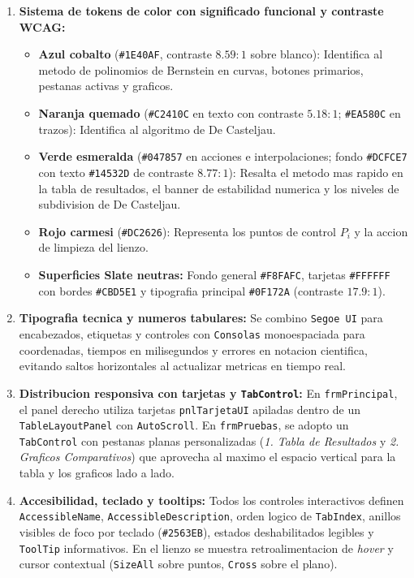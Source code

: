 \begin{enumerate}
    \item \textbf{Sistema de tokens de color con significado funcional y contraste WCAG:}
    \begin{itemize}
        \item \textbf{Azul cobalto} (\texttt{\#1E40AF}, contraste $8.59:1$ sobre blanco): Identifica al metodo de polinomios de Bernstein en curvas, botones primarios, pestanas activas y graficos.
        \item \textbf{Naranja quemado} (\texttt{\#C2410C} en texto con contraste $5.18:1$; \texttt{\#EA580C} en trazos): Identifica al algoritmo de De Casteljau.
        \item \textbf{Verde esmeralda} (\texttt{\#047857} en acciones e interpolaciones; fondo \texttt{\#DCFCE7} con texto \texttt{\#14532D} de contraste $8.77:1$): Resalta el metodo mas rapido en la tabla de resultados, el banner de estabilidad numerica y los niveles de subdivision de De Casteljau.
        \item \textbf{Rojo carmesi} (\texttt{\#DC2626}): Representa los puntos de control $P_i$ y la accion de limpieza del lienzo.
        \item \textbf{Superficies Slate neutras:} Fondo general \texttt{\#F8FAFC}, tarjetas \texttt{\#FFFFFF} con bordes \texttt{\#CBD5E1} y tipografia principal \texttt{\#0F172A} (contraste $17.9:1$).
    \end{itemize}

    \item \textbf{Tipografia tecnica y numeros tabulares:} Se combino \texttt{Segoe UI} para encabezados, etiquetas y controles con \texttt{Consolas} monoespaciada para coordenadas, tiempos en milisegundos y errores en notacion cientifica, evitando saltos horizontales al actualizar metricas en tiempo real.

    \item \textbf{Distribucion responsiva con tarjetas y \texttt{TabControl}:} En \texttt{frmPrincipal}, el panel derecho utiliza tarjetas \texttt{pnlTarjetaUI} apiladas dentro de un \texttt{TableLayoutPanel} con \texttt{AutoScroll}. En \texttt{frmPruebas}, se adopto un \texttt{TabControl} con pestanas planas personalizadas (\textit{1. Tabla de Resultados} y \textit{2. Graficos Comparativos}) que aprovecha al maximo el espacio vertical para la tabla y los graficos lado a lado.

    \item \textbf{Accesibilidad, teclado y tooltips:} Todos los controles interactivos definen \texttt{AccessibleName}, \texttt{AccessibleDescription}, orden logico de \texttt{TabIndex}, anillos visibles de foco por teclado (\texttt{\#2563EB}), estados deshabilitados legibles y \texttt{ToolTip} informativos. En el lienzo se muestra retroalimentacion de \textit{hover} y cursor contextual (\texttt{SizeAll} sobre puntos, \texttt{Cross} sobre el plano).


\end{enumerate}

